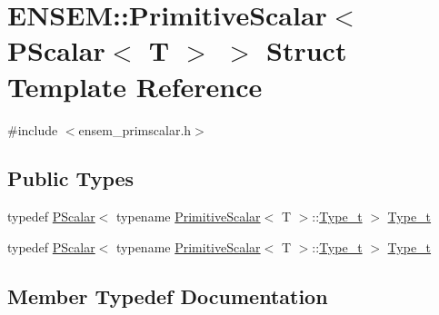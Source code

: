 \hypertarget{structENSEM_1_1PrimitiveScalar_3_01PScalar_3_01T_01_4_01_4}{}\section{E\+N\+S\+EM\+:\+:Primitive\+Scalar$<$ P\+Scalar$<$ T $>$ $>$ Struct Template Reference}
\label{structENSEM_1_1PrimitiveScalar_3_01PScalar_3_01T_01_4_01_4}


{\ttfamily \#include $<$ensem\+\_\+primscalar.\+h$>$}

\subsection*{Public Types}
\begin{DoxyCompactItemize}
\item 
typedef \mbox{\hyperlink{classENSEM_1_1PScalar}{P\+Scalar}}$<$ typename \mbox{\hyperlink{structENSEM_1_1PrimitiveScalar}{Primitive\+Scalar}}$<$ T $>$\+::\mbox{\hyperlink{structENSEM_1_1PrimitiveScalar_3_01PScalar_3_01T_01_4_01_4_a3b7d612e567079b69a727ff98d74563e}{Type\+\_\+t}} $>$ \mbox{\hyperlink{structENSEM_1_1PrimitiveScalar_3_01PScalar_3_01T_01_4_01_4_a3b7d612e567079b69a727ff98d74563e}{Type\+\_\+t}}
\item 
typedef \mbox{\hyperlink{classENSEM_1_1PScalar}{P\+Scalar}}$<$ typename \mbox{\hyperlink{structENSEM_1_1PrimitiveScalar}{Primitive\+Scalar}}$<$ T $>$\+::\mbox{\hyperlink{structENSEM_1_1PrimitiveScalar_3_01PScalar_3_01T_01_4_01_4_a3b7d612e567079b69a727ff98d74563e}{Type\+\_\+t}} $>$ \mbox{\hyperlink{structENSEM_1_1PrimitiveScalar_3_01PScalar_3_01T_01_4_01_4_a3b7d612e567079b69a727ff98d74563e}{Type\+\_\+t}}
\end{DoxyCompactItemize}


\subsection{Member Typedef Documentation}
\mbox{\label{structENSEM_1_1PrimitiveScalar_3_01PScalar_3_01T_01_4_01_4_a3b7d612e567079b69a727ff98d74563e}} 
